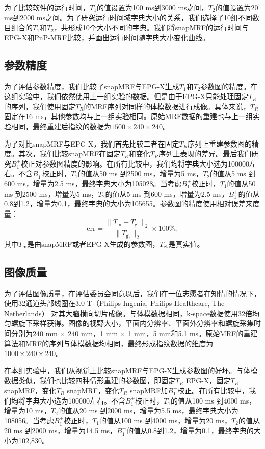 为了比较软件的运行时间，$T_1$的值设置为100 ms到3000 ms之间，$T_2$的值设置为20 ms到2000 ms之间。为了研究运行时间域字典大小的关系，我们选择了10组不同数目组合的$T_1$和$T_2$，共形成10个大小不同的字典。我们将snapMRF的运行时间与EPG-X\cite{malik_extended_2018}和PnP-MRF\cite{cloos2016multiparametric}比较，并画出运行时间随字典大小变化曲线。

\subsection{参数精度}
为了评估参数精度，我们比较了snapMRF与EPG-X生成$T_1$和$T_2$参数图的精度。在这组实验中，我们依然使用上一组实验的数据。但是由于EPG-X只能处理固定$T_R$的序列，我们使用固定$T_R$的MRF序列对同样的体模数据进行成像。具体来说，$T_R$固定在16 ms，其他参数均与上一组实验相同。原始MRF数据的重建也与上一组实验相同，最终重建后指纹的数据为$1500 \times 240 \times 240$。

为了对比snapMRF与EPG-X，我们首先比较二者在固定$T_R$序列上重建参数图的精度。其次，我们比较snapMRF在固定$T_R$和变化$T_R$序列上表现的差异。最后我们研究$B_1^+$校正对参数图精度的影响。在所有比较中，我们均将字典大小选为100000左右。不含$B_1^+$校正时，$T_1$的值从50 ms 到2500 ms，增量为5 ms，$T_2$的值从5 ms 到600 ms，增量为2.5 ms，最终字典大小为105028。当考虑$B_1^+$校正时，$T_1$的值从50 ms 到2500 ms，增量为5 ms，$T_2$的值从5 ms 到600 ms，增量为2.5 ms，$B_1^+$的值从0.8到1.2，增量为0.1，最终字典的大小为105655。参数图的精度使用相对误差来度量：
\begin{equation}
	\mathrm{err} = \frac{\|T_\mathrm{m}-T_\mathrm{gt}\|_2}{\|T_\mathrm{gt}\|_2}\times 100\%,
\end{equation}
其中$T_\mathrm{m}$是由snapMRF或者EPG-X生成的参数图，$T_\mathrm{gt}$是真实值。

\subsection{图像质量}
为了评估图像质量，在评估委员会同意以后，我们在一位志愿者在知情的情况下，使用32通道头部线圈在3.0 T（Philips Ingenia, Philips Healthcare, The Netherlands） 对其大脑横向切片成像。与体模数据相同，k-space数据使用32倍均匀螺旋下采样获得\cite{pipe_spiral_2014}。图像的视野大小，平面内分辨率、平面外分辨率和螺旋采集时间分别为240 mm $\times$ 240 mm，1 mm $\times$ 1 mm，5 mm和5.1 ms。原始MRF的重建算法和MRF的序列与体模数据均相同，最终形成指纹数据的维度为$1000 \times 240 \times 240$。

在本组实验中，我们从视觉上比较snapMRF与EPG-X生成参数图的好坏。与体模数据类似，我们也比较四种情形重建的参数图，即固定$T_R$ EPG-X，固定$T_R$ snapMRF，变化$T_R$ snapMRF，变化$T_R$ snapMRF加$B_1^+$校正。在所有比较中，我们均将字典大小选为100000左右。不含$B_1^+$校正时，$T_1$的值从100 ms 到4000 ms，增量为10 ms，$T_2$的值从20 ms 到2000 ms，增量为5.5 ms，最终字典大小为108056。当考虑$B_1^+$校正时，$T_1$的值从100 ms 到4000 ms，增量为20 ms，$T_2$的值从20 ms 到2000 ms，增量为14.5 ms，$B_1^+$的值从0.8到1.2，增量为0.1，最终字典的大小为102,830。

